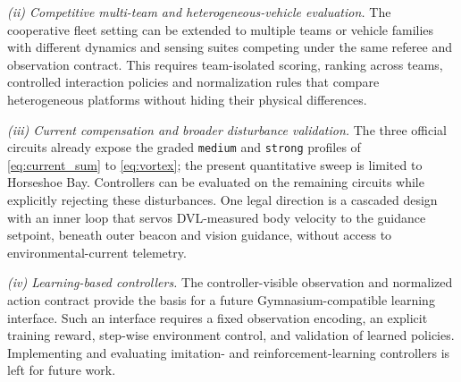 \emph{(ii) Competitive multi-team and heterogeneous-vehicle evaluation.} The cooperative fleet setting can be extended to multiple teams or vehicle families with different dynamics and sensing suites competing under the same referee and observation contract. This requires team-isolated scoring, ranking across teams, controlled interaction policies and normalization rules that compare heterogeneous platforms without hiding their physical differences.

\emph{(iii) Current compensation and broader disturbance validation.} The three official circuits already expose the graded \texttt{medium} and \texttt{strong} profiles of \eqref{eq:current_sum} to \eqref{eq:vortex}; the present quantitative sweep is limited to Horseshoe Bay. Controllers can be evaluated on the remaining circuits while explicitly rejecting these disturbances. One legal direction is a cascaded design with an inner loop that servos DVL-measured body velocity to the guidance setpoint, beneath outer beacon and vision guidance, without access to environmental-current telemetry.

\emph{(iv) Learning-based controllers.} The controller-visible observation and normalized action contract provide the basis for a future Gymnasium-compatible learning interface. Such an interface requires a fixed observation encoding, an explicit training reward, step-wise environment control, and validation of learned policies. Implementing and evaluating imitation- and reinforcement-learning controllers is left for future work.
